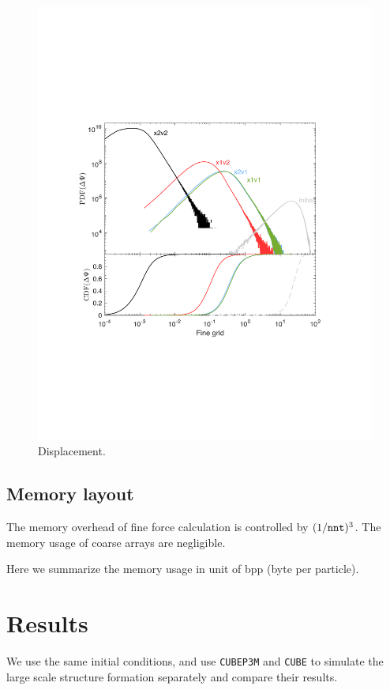 \documentclass[10pt,twocolumn,preprint]{emulateapj}
\begin{document}
\begin{figure}[t]
\centering
  \includegraphics[width=0.95\linewidth]{ddsp_pcdf_256_box80.pdf}
 \caption{Displacement.}
\label{fig.dsp}
\end{figure}


\subsection{Memory layout}\label{ss.memory}
The memory overhead of fine force calculation is controlled by $(1/{\tt nnt})^3$. The memory usage of coarse arrays are negligible. 

Here we summarize the memory usage in unit of bpp (byte per particle).

\section{Results}\label{s.results}
We use the same initial conditions, and use {\tt CUBEP3M} and {\tt CUBE} to simulate the large scale structure formation separately and compare their results.
\end{document}
